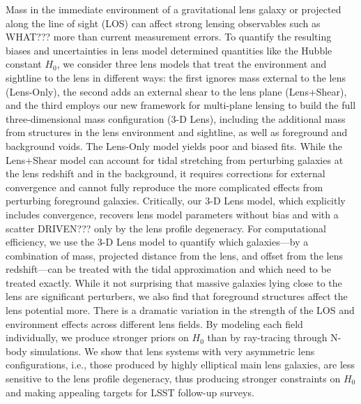 Mass in the immediate environment of a gravitational lens galaxy or projected along the line of sight (LOS) can affect strong lensing observables such as WHAT??? more than current measurement errors. To quantify the resulting biases and uncertainties in lens model determined quantities like the Hubble constant $H_0$, we consider three lens models that treat the environment and sightline to the lens in different ways: the first ignores mass external to the lens (Lens-Only), the second adds an external shear to the lens plane (Lens+Shear), and the third employs our new 
framework for multi-plane lensing \citep{McCully14} to build the full three-dimensional mass configuration (3-D Lens), including the additional mass from structures in the lens environment and sightline, as well as foreground and background voids.  The Lens-Only model yields poor and biased fits.  While the Lens+Shear model can 
account for tidal stretching from perturbing galaxies at the lens redshift and in the background, it requires corrections for external convergence and cannot fully reproduce the more 
complicated effects from perturbing foreground galaxies.  Critically, our 3-D Lens model, which explicitly includes convergence, recovers lens model parameters without bias and with a scatter DRIVEN??? only by the lens profile degeneracy.  For computational efficiency, we use the 3-D Lens model to quantify which galaxies---by a combination of mass, projected distance from the lens, and offset from the lens redshift---can be treated with the tidal approximation and which need to be treated exactly.  While it not surprising that massive galaxies lying close to the lens are significant perturbers, we also find that foreground structures affect the lens potential more.
There is a dramatic variation in the strength of the LOS and environment effects across different lens fields.  By modeling each field 
individually, we produce stronger priors on $H_0$ than by ray-tracing through N-body simulations.  We show that lens systems with very asymmetric lens configurations, i.e., those produced by highly elliptical main lens galaxies, are less sensitive to the lens profile degeneracy, thus producing stronger constraints on $H_0$ and making appealing targets for LSST follow-up surveys.
  
  
  